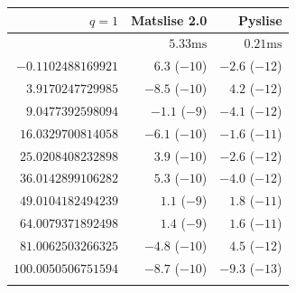 \begin{table}
  \begin{center}
    \begin{tabular}[]{rrr}
      \toprule
      $q=1$               & Matslise 2.0    & Pyslise         \\
      \midrule
                          & $5.33\text{ms}$ & $0.21\text{ms}$ \\
      $-0.1102488169921$  & $6.3$ ($-10$)   & $-2.6$ ($-12$)  \\
      $3.9170247729985$   & $-8.5$ ($-10$)  & $4.2$ ($-12$)   \\
      $9.0477392598094$   & $-1.1$ ($-9$)   & $-4.1$ ($-12$)  \\
      $16.0329700814058$  & $-6.1$ ($-10$)  & $-1.6$ ($-11$)  \\
      $25.0208408232898$  & $3.9$ ($-10$)   & $-2.6$ ($-12$)  \\
      $36.0142899106282$  & $5.3$ ($-10$)   & $-4.0$ ($-12$)  \\
      $49.0104182494239$  & $1.1$ ($-9$)    & $1.8$ ($-11$)   \\
      $64.0079371892498$  & $1.4$ ($-9$)    & $1.6$ ($-11$)   \\
      $81.0062503266325$  & $-4.8$ ($-10$)  & $4.5$ ($-12$)   \\
      $100.0050506751594$ & $-8.7$ ($-10$)  & $-9.3$ ($-13$)  \\
                          &                 &                 \\
      \bottomrule
    \end{tabular}
  \end{center}



\end{table}
